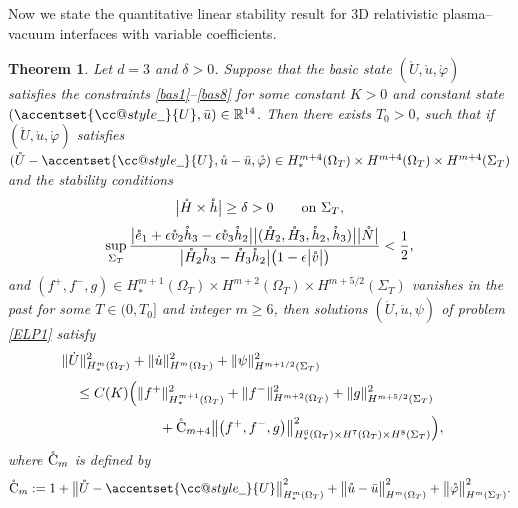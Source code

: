 \documentclass[twoside,11pt]{article}
\makeatletter
\numberwithin{equation}{section}
\newtheorem{theorem}{Theorem}[section]
\def\widebar{\accentset{{\cc@style\underline{\mskip10mu}}}}
\makeatother
\begin{document}
	
	Now we state the quantitative linear stability result for 3D relativistic plasma--vacuum interfaces with variable coefficients.
	\begin{theorem}
		\label{thm:main1}
Let $d=3$ and $\delta>0$.		
Suppose that the basic state  $(\mathring{U},\mathring{u},\mathring{\varphi}) $ satisfies
the constraints \eqref{bas1}--\eqref{bas8} for some constant $K>0$ and constant state $(\widebar{U},\bar{u})\in\mathbb{R}^{14}$.
Then there exists $T_0>0$, such that if
$(\mathring{U},\mathring{u},\mathring{\varphi}) $ satisfies
$(\mathring{U}-\widebar{U},\mathring{u}-\bar{u},\mathring{\varphi}) \in H_*^{{m+4}}(\Omega_{T})\times H^{{m+4}}(\Omega_{T}) \times  H^{{m+4}}(\Sigma_T)$
and the stability conditions
\begin{gather}
		\label{non-coll}
{ \big|\mathring{H}\times \mathring{h}\big|\geq \delta >0 \qquad \textnormal{on }\Sigma_T,}\\[1mm]
\sup_{\Sigma_{T}}\frac{\big|\mathring{e}_1+\epsilon \mathring{v}_2\mathring{h}_3-\epsilon \mathring{v}_3\mathring{h}_2\big| \big| {  (  \mathring{H}_2, \mathring{H}_3, \mathring{h}_2,\mathring{h}_3)}\big|\big|\mathring{N}\big|}{\big|\mathring{H}_2\mathring{h}_3 -\mathring{H}_3\mathring{h}_2\big|\big(1-\epsilon\big|\mathring{v}\big|\big)} <\frac{1}{2},
		\label{stability3D}
\end{gather}
and $(f^+,f^-,g )\in H_*^{m+1}(\Omega_{T})\times H^{m+2}(\Omega_{T})\times H^{m+{5/2}}(\Sigma_{T})$ vanishes in the past
for some $T\in (0, T_0]$ and integer $m\geq 6$, then solutions $(\dot{U},\dot{u},\psi)$ of problem \eqref{ELP1} satisfy
\begin{align}
	\nonumber
	&\|\dot{U}\|_{H_*^{m}(\Omega_{T})}^2+
	\|\dot{u}\|_{H^{m}(\Omega_{T})}^2+	\|\psi\|_{H^{m+1/2}(\Sigma_T)}^2&&
	\\[1mm]
	&\quad \leq C(K)\Big(
	\|f^+  \|_{H_*^{m+1}(\Omega_{T}) }^2+\|f^-  \|_{H^{m+2}(\Omega_{T}) }^2
	+\|g\|_{H^{m+{5/2}}(\Sigma_T)}^2&&
	\nonumber\\[1mm]
	& \hspace*{7em}
	+	\mathring{\rm C}_{m+4}
	\big\|\big(f^+,f^-, g \big) \big\|_{H_*^{6}(\Omega_{T}) \times H^{7}(\Omega_{T}) \times H^{8}(\Sigma_{T})  }^2\Big), &&
	\label{tame.es}
\end{align}	
where $\mathring{\rm C}_{m}$ is defined by
\begin{align}
	\label{norm:ring} 	
	\mathring{\rm C}_{m}:= 		 1+ \big\|\mathring{U}-\widebar{U}\big\|_{H_*^{m}(\Omega_{T})}^2+\big\|\mathring{u}-\bar{u}\big\|_{H^{m}(\Omega_{T})}^2 +\big\|\mathring{\varphi} \big\|_{H^{m}(\Sigma_{T})}^2.
\end{align}
	\end{theorem}
\end{document}
